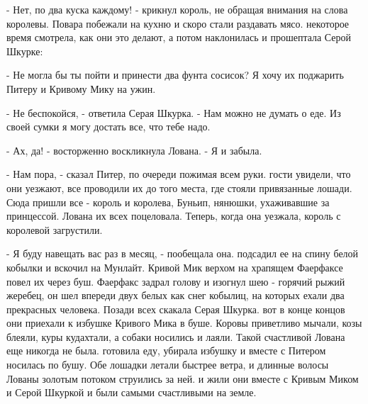 \par- Нет, по два куска каждому! - крикнул король, не обращая внимания 
на слова королевы. Повара побежали на кухню и скоро стали раздавать 
мясо.
 некоторое время смотрела, как они это делают, а потом 
наклонилась и прошептала Серой Шкурке:
\par- Не могла бы ты пойти и принести два фунта сосисок? Я хочу их 
поджарить Питеру и Кривому Мику на ужин.
\par- Не беспокойся, - ответила Серая Шкурка. - Нам можно не думать о 
еде. Из своей сумки я могу достать все, что тебе надо.
\par- Ах, да! - восторженно воскликнула Лована. - Я и забыла.
\par- Нам пора, - сказал Питер, по очереди пожимая всем руки.
 гости увидели, что они уезжают, все проводили их до того 
места, где стояли привязанные лошади. Сюда пришли все - король и 
королева, Буньип, нянюшки, ухаживавшие за принцессой. Лована их всех 
поцеловала. Теперь, когда она уезжала, король с королевой загрустили.
\par- Я буду навещать вас раз в месяц, - пообещала она.
 подсадил ее на спину белой кобылки и вскочил на Мунлайт. 
Кривой Мик верхом на храпящем Фаерфаксе повел их через буш. Фаерфакс 
задрал голову и изогнул шею - горячий рыжий жеребец, он шел впереди 
двух белых как снег кобылиц, на которых ехали два прекрасных человека. 
Позади всех скакала Серая Шкурка.
 вот в конце концов они приехали к избушке Кривого Мика в буше. 
Коровы приветливо мычали, козы блеяли, куры кудахтали, а собаки 
носились и лаяли. Такой счастливой Лована еще никогда не была.
 готовила еду, убирала избушку и вместе с Питером носилась по 
бушу. Обе лошадки летали быстрее ветра, и длинные волосы Лованы 
золотым потоком струились за ней.
 и жили они вместе с Кривым Миком и Серой Шкуркой и были самыми 
счастливыми на земле.
